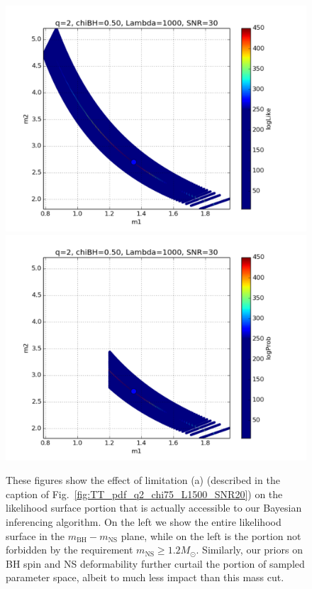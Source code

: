 \documentclass[aps,prd,amsmath,floats,floatfix, twocolumn,
superscriptaddress,nofootinbib,showpacs]{revtex4-1}
\newcommand{\mbh}{m_\mathrm{BH}}
\newcommand{\mns}{m_\mathrm{NS}}
\begin{document}
\begin{figure}
\centering    
\includegraphics[width=\columnwidth]{plots/TT_logLike_vs_m1_m2_eta0-22_Mc1-64_chi0-00_chi0-50_L1000-0_SNR30.pdf}
\includegraphics[width=\columnwidth]{plots/TT_logProb_vs_m1_m2_eta0-22_Mc1-64_chi0-00_chi0-50_L1000-0_SNR30.pdf}
\caption{These figures show the effect of limitation (a) (described in the caption
of Fig.~\ref{fig:TT_pdf_q2_chi75_L1500_SNR20}) on the likelihood surface portion
that is actually accessible to our Bayesian inferencing algorithm. On the left we show the
entire likelihood surface in the $\mbh-\mns$ plane, while on the left is the 
portion not forbidden by the requirement $\mns\geq 1.2M_\odot$. Similarly, our
priors on BH spin and NS deformability further curtail the portion of sampled
parameter space, albeit to much less impact than this mass cut.}
\label{fig:TT_logLikeProb_q2_chi75_L1500_SNR20}
\end{figure}
\end{document}
